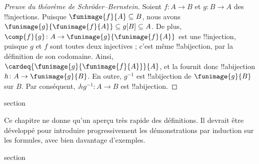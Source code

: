 \documentclass[11pt,a4paper,openany]{memoir}
\begin{document}
\begin{proof}[Preuve du théorème de Schröder--Bernstein]
Soient $f\colon A\to B$ et $g\colon B\to A$ des !!{injection}s.
Puisque $\funimage{f}{A}\subseteq B$, nous avons
$\funimage{g}{\funimage{f}{A}}\subseteq g[B]\subseteq A$.
De plus, $\comp{f}{g}\colon A\to\funimage{g}{\funimage{f}{A}}$
est une !!{injection}, puisque $g$ et $f$ sont toutes deux injectives ;
c'est même !!a{bijection}, par la définition de son codomaine.
Ainsi, $\cardeq{\funimage{g}{\funimage{f}{A}}}{A}$, et la
 fournit donc !!a{bijection}
$h\colon A\to\funimage{g}{B}$. En outre, $g^{-1}$ est !!a{bijection}
de $\funimage{g}{B}$ sur $B$. Par conséquent,
$\comp{h}{g^{-1}}\colon A\to B$ est !!a{bijection}.
\end{proof}


\endgroup



\endgroup


\begingroup
\expandafter\def\csname ol@sectioncs\endcsname{section}
\def\olfilename{syntax-and-semantics}



\begin{editorial}
Ce chapitre ne donne qu'un aperçu très rapide des définitions. Il
devrait être développé pour introduire progressivement les
démonstrations par induction sur les formules, avec bien davantage
d'exemples.
\end{editorial}


\begingroup
\expandafter\def\csname ol@sectioncs\endcsname{section}
\def\olfilename{introduction}



\end{document}
